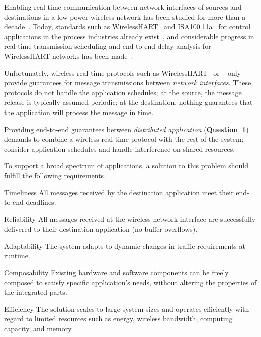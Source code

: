 Enabling real-time communication {between network interfaces} of sources and destinations in a low-power wireless network has been studied for more than a decade~\cite{lu2002RAP,stankovic2003Realtime,he2003SPEED}. Today, standards such as WirelessHART~\cite{wirelessHART} and ISA100.11a~\cite{isa100} for control applications in the process industries already exist~\cite{watteyne2017Teaching}, and considerable progress in real-time transmission scheduling and end-to-end delay analysis for WirelessHART networks has been made~\cite{saifullah2010RealTime,saifullah2015EndtoEnd}.

Unfortunately, wireless real-time protocols such as WirelessHART~\cite{wirelessHART} or \blink~\cite{zimmerling2017Blink} only provide guarantees for message transmissions between \emph{network interfaces}. These protocols do not handle the application schedules; at the source, the message release is typically assumed periodic; at the destination, nothing guarantees that the application will process the message in time.

Providing end-to-end guarantees between \emph{distributed application} (\textbf{Question~1}) demands to combine a wireless real-time protocol with the rest of the system; \ie consider application schedules and handle interference on shared resources.

To support a broad spectrum of \CPS applications, a solution to this problem should fulfill the following requirements.
\begin{features}

  \item[Timeliness]
  All messages received by the destination application meet their end-to-end deadlines.

  \item[Reliability]
  All messages received at the wireless network interface are {successfully delivered} to their destination application (\ie no buffer overflows).

  \item[Adaptability]
  The system adapts to dynamic changes in traffic requirements at runtime.

  \item[Composability]
  Existing hardware and software components can be freely composed to satisfy specific application's needs, without altering the properties of the integrated parts.

  \item[Efficiency] The solution scales to large system sizes and operates efficiently with regard to limited resources such as energy, wireless bandwidth, computing capacity, and memory.

\end{features}

